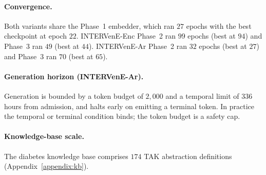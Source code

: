 \paragraph{Convergence.}
Both variants share the Phase~1 embedder, which ran $27$ epochs with the best checkpoint at epoch $22$. INTERVenE-Enc Phase~2 ran $99$ epochs (best at $94$) and Phase~3 ran $49$ (best at $44$). INTERVenE-Ar Phase~2 ran $32$ epochs (best at $27$) and Phase~3 ran $70$ (best at $65$).

\paragraph{Generation horizon (INTERVenE-Ar).}
Generation is bounded by a token budget of $2{,}000$ and a temporal limit of $336$ hours from admission, and halts early on emitting a terminal token. In practice the temporal or terminal condition binds; the token budget is a safety cap.

\paragraph{Knowledge-base scale.}
The diabetes knowledge base comprises $174$ TAK abstraction definitions (Appendix~\ref{appendix:kb}).
